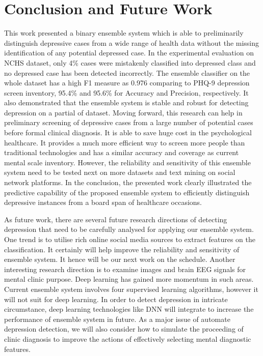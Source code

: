 \documentclass[10pt,journal,compsoc]{IEEEtran}
\begin{document}




\section{Conclusion and Future Work}
This work presented a binary ensemble system which is able to preliminarily distinguish depressive cases from a wide range of health data without the missing identification of any potential depressed case. In the experimental evaluation on NCHS dataset, only 4\% cases were mistakenly classified into depressed class and no depressed case has been detected incorrectly. The ensemble classifier on the whole dataset has a high F1 measure as 0.976 comparing to PHQ-9 depression screen inventory, 95.4\% and 95.6\% for Accuracy and Precision, respectively. It also demonstrated that the ensemble system is stable and robust for detecting depression on a partial of dataset. Moving forward, this research can help in preliminary screening of depressive cases from a large number of potential cases before formal clinical diagnosis. It is able to save huge cost in the psychological healthcare. It provides a much more efficient way to screen more people than traditional technologies and has a similar accuracy and coverage as current mental scale inventory. However, the reliability and sensitivity of this ensemble system need to be tested next on more datasets and text mining on social network platforms. In the conclusion, the presented work clearly illustrated the predictive capability of the proposed ensemble system to efficiently distinguish depressive instances from a board span of healthcare occasions.

As future work, there are several future research directions of detecting depression that need to be carefully analysed for applying our ensemble system. One trend is to utilise rich online social media sources to extract features on the classification. It certainly will help improve the reliability and sensitivity of ensemble system. It hence will be our next work on the schedule.  Another interesting research direction is to examine images and brain EEG signals for mental clinic purpose. Deep learning has gained more momentum in such areas. Current ensemble system involves four supervised learning algorithms, however it will not suit for deep learning. In order to detect depression in intricate circumstance, deep learning technologies like DNN will integrate to increase the performance of ensemble system in future. As a major issue of automate depression detection, we will also consider how to simulate the proceeding of clinic diagnosis to improve the actions of effectively selecting mental diagnostic features. 
\end{document}
